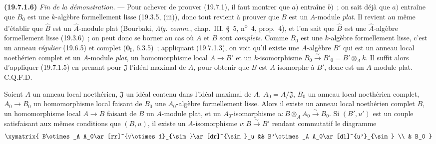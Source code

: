 \medskip
\noindent\textbf{(19.7.1.6)}\enspace
\emph{Fin de la démonstration.} --- Pour achever de prouver (19.7.1), il faut
montrer que $a)$ entraîne $b)$~; on sait déjà que $a)$ entraîne que $B_0$ est
une $k$-algèbre formellement lisse (19.3.5, (iii)), donc tout revient à prouver
que $B$ est un $A$-module \emph{plat}. Il revient au même d'établir que $\widehat B$
est un $\widehat A$-module plat (Bourbaki, \emph{Alg. comm.}, chap.~III, §~5,
n\textsuperscript{o}~4, prop.~4), et l'on sait que $\widehat B$ est une
$\widehat A$-algèbre formellement lisse (19.3.6)~; on peut donc se borner au
cas où $A$ et $B$ sont \emph{complets}. Comme $B_0$ est une $k$-algèbre formellement
lisse, c'est un anneau \emph{régulier} (19.6.5) et complet
($\mathbf 0_{\mathrm I}$, 6.3.5)~; appliquant (19.7.1.3), on voit qu'il existe
une $A$-algèbre $B'$ qui est un anneau local noethérien complet et un
$A$-module \emph{plat}, un homomorphisme local $A\to B'$ et un $k$-isomorphisme
$B_0\xrightarrow{\sim}B'_0=B'\otimes_A k$. Il suffit alors d'appliquer (19.7.1.5) en
prenant pour $\mathfrak J$ l'idéal maximal de $A$, pour obtenir que $B$ est
$A$-isomorphe à $B'$, donc est un $A$-module plat. C.Q.F.D.

\begin{theorem}[19.7.2]
\label{0.19.7.2-fr}
Soient $A$ un anneau local noethérien, $\mathfrak J$ un idéal contenu dans
l'idéal maximal de $A$, $A_0=A/\mathfrak J$, $B_0$ un anneau local noethérien
complet, $A_0\to B_0$ un homomorphisme local faisant de $B_0$ une
$A_0$-algèbre formellement lisse. Alors il existe un anneau local noethérien
complet $B$, un homomorphisme local $A\to B$ faisant de $B$ un $A$-module
\textup{plat}, et un $A_0$-isomorphisme
$u:B\otimes_A A_0\xrightarrow{\sim}B_0$. Si $(B',u')$ est un couple
satisfaisant aux mêmes conditions que $(B,u)$, il existe un $A$-isomorphisme
$v:B\xrightarrow{\sim}B'$ rendant commutatif le diagramme
\[
\xymatrix{
  B\otimes_A A_0\ar[rr]^{v\otimes1}_{\sim}\ar[dr]^{\sim}_u &&
  B'\otimes_A A_0\ar[dl]^{u'}_{\sim} \\
  & B_0
}
\]
\end{theorem}


